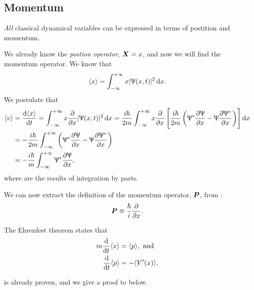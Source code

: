 \subsection{Momentum}
\begin{post}
\textit{All} classical dynamical variables can be expressed in terms of postition and momentum. 
\end{post}
We already know the \textit{postion operator}, $\boldsymbol{X}=x$, and now we will find the momentum operator. We know that 
\begin{equation}
\langle x\rangle=\intinf x\lvert\ups(x,t)\rvert^2 \dx. 
\end{equation}
We postulate that 
\begin{subequations}
\begin{align}
\langle v\rangle&=\diff{\langle x\rangle}{t}=\intinf x\diffp*{\lvert\ups(x,t)\rvert^2}x\dx=\frac{i\hbar}{2m}\intinf x\diffp*{\left[\frac{i\hbar}{2m}\left(\ups^*\diffp{\ups}{x}-\ups\diffp{\ups^*}{x}\right)\right]}x\dx \\
&=-\frac{i\hbar}{2m}\intinf\left(\ups^*\diffp{\ups}{x}-\ups\diffp{\ups^*}{x}\right) \label{mom2}\\
&=-\frac{i\hbar}{m}\intinf\ups^*\diffp{\ups}{x}, \label{mom3}
\end{align}
\end{subequations}
where  are the results of integration by parts. \\
\begin{defi}
We can now extract the definition of the momentum operator, $\boldsymbol{P}$, from : 
\begin{equation}
\boldsymbol{P}\equiv\frac{\hbar}{i}\frac{\partial}{\partial x}.
\end{equation}
\end{defi}
\begin{thrm}
\label{eft}
The Ehrenfest theorem states that 
\begin{subequations}
\begin{align}
m\diff*{\langle x\rangle}t&=\langle p \rangle, \text{\ and}\label{eft1}\\
\diff*{\langle p\rangle}t&=-\langle V'(x)\rangle. \label{eft2}
\end{align}
\end{subequations}
\end{thrm}
 is already proven, and we give a proof to  below. 
